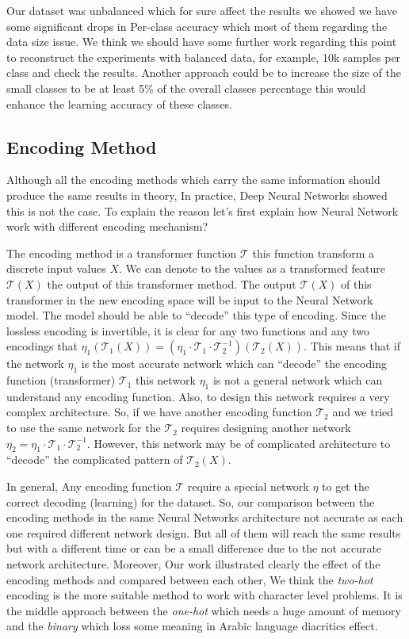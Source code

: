 Our dataset was unbalanced which for sure affect the results we showed we have some significant drops in Per-class accuracy which most of them regarding the data size issue. We think we should have some further work regarding this point to reconstruct the experiments with balanced data, for example, 10k samples per class and check the results. Another approach could be to increase the size of the small classes to be at least 5\% of the overall classes percentage this would enhance the learning accuracy of these classes. 
\subsection{Encoding Method}

Although all the encoding methods which carry the same information should produce the same results in theory, In practice, Deep Neural Networks showed this is not the case. To explain the reason let’s first explain how Neural Network work with different encoding mechanism?

The encoding method is a transformer function $\mathcal{T}$ this function transform a discrete input values $X$. We can denote to the values as a transformed feature $\mathcal{T}(X)$ the output of this transformer method. The output $\mathcal{T}(X)$ of this transformer in the new encoding space will be input to the Neural Network model. The model should be able to ``decode'' this type of encoding. Since the lossless encoding is invertible, it is clear for any two functions and any two encodings that $\eta_1\left(\mathcal{T}_1(X)\right) = \left(\eta_1\cdot\mathcal{T}_1\cdot \mathcal{T}_2^{-1} \right)\left(\mathcal{T}_2(X)\right)$. This means that if the network $\eta_1$ is the most accurate network which can ``decode'' the encoding function (transformer) $\mathcal{T}_1$ this network $\eta_1$ is not a general network which can understand any encoding function. Also, to design this network requires a very complex architecture. So, if we have another encoding function $\mathcal{T}_2$ and we tried to use the same network for the $\mathcal{T}_2$ requires designing another network $\eta_2 = \eta_1\cdot\mathcal{T}_1\cdot \mathcal{T}_2^{-1}$. However, this network may be of complicated architecture to ``decode'' the complicated pattern of $\mathcal{T}_2(X)$.

In general, Any encoding function $\mathcal{T}$ require a special network $\eta$ to get the correct decoding (learning) for the dataset. So, our comparison between the encoding methods in the same Neural Networks architecture not accurate as each one required different network design. But all of them will reach the same results but with a different time or can be a small difference due to the not accurate network architecture. Moreover, Our work illustrated clearly the effect of the encoding methods and compared between each other, We think the \textit{\textit{two-hot}} encoding is the more suitable method to work with character level problems. It is the middle approach between the \textit{\textit{one-hot}} which needs a huge amount of memory and the \textit{\textit{binary}} which loss some meaning in Arabic language diacritics effect.


